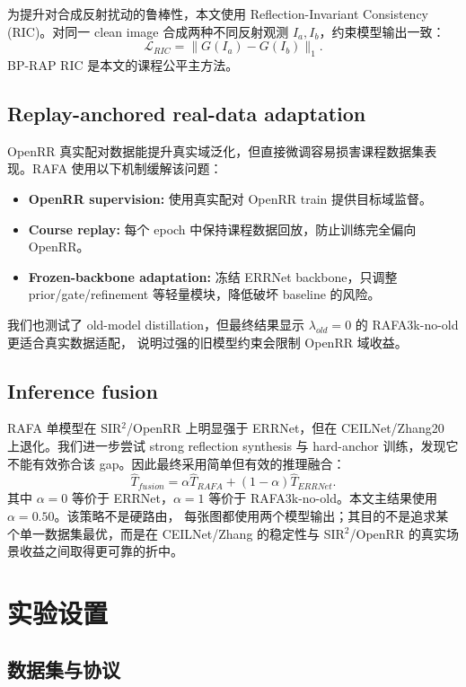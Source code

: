 \documentclass{article}
\begin{document}
为提升对合成反射扰动的鲁棒性，本文使用 Reflection-Invariant Consistency (RIC)。对同一 clean image 合成两种不同反射观测
$I_a,I_b$，约束模型输出一致：
\begin{equation}
\mathcal{L}_{RIC}=\|G(I_a)-G(I_b)\|_1.
\end{equation}
BP-RAP RIC 是本文的课程公平主方法。

\subsection{Replay-anchored real-data adaptation}

OpenRR 真实配对数据能提升真实域泛化，但直接微调容易损害课程数据集表现。RAFA 使用以下机制缓解该问题：
\begin{itemize}
  \item \textbf{OpenRR supervision:} 使用真实配对 OpenRR train 提供目标域监督。
  \item \textbf{Course replay:} 每个 epoch 中保持课程数据回放，防止训练完全偏向 OpenRR。
  \item \textbf{Frozen-backbone adaptation:} 冻结 ERRNet backbone，只调整 prior/gate/refinement 等轻量模块，降低破坏 baseline 的风险。
\end{itemize}
我们也测试了 old-model distillation，但最终结果显示 $\lambda_{old}=0$ 的 RAFA3k-no-old 更适合真实数据适配，
说明过强的旧模型约束会限制 OpenRR 域收益。

\subsection{Inference fusion}

RAFA 单模型在 SIR$^2$/OpenRR 上明显强于 ERRNet，但在 CEILNet/Zhang20 上退化。我们进一步尝试 strong reflection
synthesis 与 hard-anchor 训练，发现它不能有效弥合该 gap。因此最终采用简单但有效的推理融合：
\begin{equation}
\hat{T}_{fusion} = \alpha \hat{T}_{RAFA} + (1-\alpha)\hat{T}_{ERRNet}.
\end{equation}
其中 $\alpha=0$ 等价于 ERRNet，$\alpha=1$ 等价于 RAFA3k-no-old。本文主结果使用 $\alpha=0.50$。该策略不是硬路由，
每张图都使用两个模型输出；其目的不是追求某个单一数据集最优，而是在 CEILNet/Zhang 的稳定性与 SIR$^2$/OpenRR 的真实场景收益之间取得更可靠的折中。

\section{实验设置}

\subsection{数据集与协议}
\end{document}
